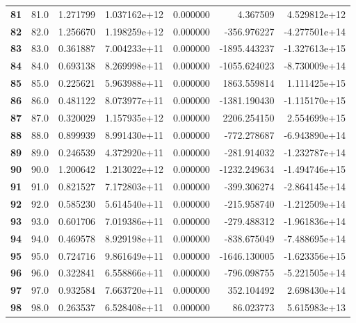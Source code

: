\documentclass{report}[12pt]
\begin{document}
\begin{center}
\begin{tabular}{lrrrrrr}
\textbf{81  } &           81.0 &   1.271799 &  1.037162e+12 &    0.000000 &     4.367509 &  4.529812e+12 \\
\textbf{82  } &           82.0 &   1.256670 &  1.198259e+12 &    0.000000 &  -356.976227 & -4.277501e+14 \\
\textbf{83  } &           83.0 &   0.361887 &  7.004233e+11 &    0.000000 & -1895.443237 & -1.327613e+15 \\
\textbf{84  } &           84.0 &   0.693138 &  8.269998e+11 &    0.000000 & -1055.624023 & -8.730009e+14 \\
\textbf{85  } &           85.0 &   0.225621 &  5.963988e+11 &    0.000000 &  1863.559814 &  1.111425e+15 \\
\textbf{86  } &           86.0 &   0.481122 &  8.073977e+11 &    0.000000 & -1381.190430 & -1.115170e+15 \\
\textbf{87  } &           87.0 &   0.320029 &  1.157935e+12 &    0.000000 &  2206.254150 &  2.554699e+15 \\
\textbf{88  } &           88.0 &   0.899939 &  8.991430e+11 &    0.000000 &  -772.278687 & -6.943890e+14 \\
\textbf{89  } &           89.0 &   0.246539 &  4.372920e+11 &    0.000000 &  -281.914032 & -1.232787e+14 \\
\textbf{90  } &           90.0 &   1.200642 &  1.213022e+12 &    0.000000 & -1232.249634 & -1.494746e+15 \\
\textbf{91  } &           91.0 &   0.821527 &  7.172803e+11 &    0.000000 &  -399.306274 & -2.864145e+14 \\
\textbf{92  } &           92.0 &   0.585230 &  5.614540e+11 &    0.000000 &  -215.958740 & -1.212509e+14 \\
\textbf{93  } &           93.0 &   0.601706 &  7.019386e+11 &    0.000000 &  -279.488312 & -1.961836e+14 \\
\textbf{94  } &           94.0 &   0.469578 &  8.929198e+11 &    0.000000 &  -838.675049 & -7.488695e+14 \\
\textbf{95  } &           95.0 &   0.724716 &  9.861649e+11 &    0.000000 & -1646.130005 & -1.623356e+15 \\
\textbf{96  } &           96.0 &   0.322841 &  6.558866e+11 &    0.000000 &  -796.098755 & -5.221505e+14 \\
\textbf{97  } &           97.0 &   0.932584 &  7.663720e+11 &    0.000000 &   352.104492 &  2.698430e+14 \\
\textbf{98  } &           98.0 &   0.263537 &  6.528408e+11 &    0.000000 &    86.023773 &  5.615983e+13 \\

\end{tabular}
\end{center}
\end{document}
